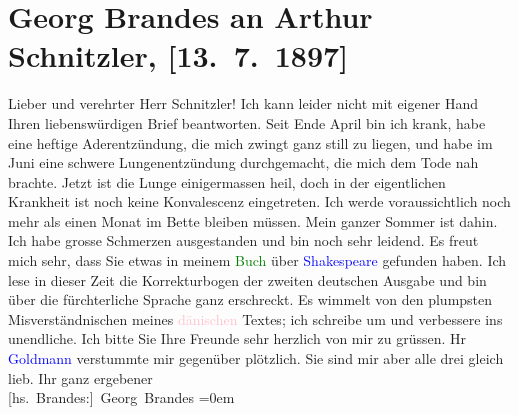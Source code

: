 

               \section[Georg Brandes an Arthur Schnitzler, {[}13. 7. 1897{]}]{ Georg Brandes an Arthur Schnitzler, {[}13. 7. 1897{]}}\nopagebreak{}\rehead{ }\normalsize\beginnumbering{} \toendnotes[C]{\smallbreak\pagebreak[2]} 
\toendnotes[C]{\smallbreak}\pstart{}{\pb}Lieber und verehrter
                        Herr Schnitzler!\pend\pstart
           Ich kann leider nicht mit eigener Hand Ihren liebenswürdigen Brief beantworten.
                    Seit Ende April bin ich krank, habe eine heftige Aderentzündung,
                    die mich zwingt ganz still zu liegen, und habe im Juni eine schwere
                    Lungenentzündung durchgemacht, die mich dem Tode nah brachte. Jetzt ist die
                    Lunge einigermassen heil, doch in der eigentlichen Krankheit ist noch keine
                    Konvalescenz eingetreten. Ich werde voraussichtlich noch mehr als einen Monat im
                    Bette bleiben müssen. Mein ganzer Sommer ist dahin. Ich habe grosse Schmerzen
                    ausgestanden und bin noch sehr leidend.\pend
           \pstart
           Es freut mich sehr, dass Sie etwas in {\pb}meinem \textcolor{green}{Buch}{} über \textcolor{blue}{Shakespeare}{}\ledrightnote{\textcolor{blue}{William Shakespeare}} gefunden haben. Ich lese in dieser Zeit die Korrekturbogen
                    der zweiten deutschen Ausgabe und bin über die fürchterliche Sprache ganz
                    erschreckt. Es wimmelt von den plumpsten Misverständnischen meines \textcolor{pink}{dänischen}{}\ledrightnote{\textcolor{pink}{Dänemark}} Textes; ich schreibe um und
                    verbessere ins unendliche.\pend
           \pstart
           Ich bitte Sie Ihre Freunde sehr herzlich von mir zu grüssen. Hr \textcolor{blue}{Goldmann}{}\ledrightnote{\textcolor{blue}{Paul Goldmann}} verstummte mir gegenüber plötzlich. Sie sind mir
                    aber alle drei gleich lieb.\pend
           \pstart
           Ihr ganz ergebener{\\[\baselineskip]}\spacefill\mbox{{[}hs. Brandes:{]} Georg Brandes}\pend
           \leftskip=0em{}\endnumbering{}  
      